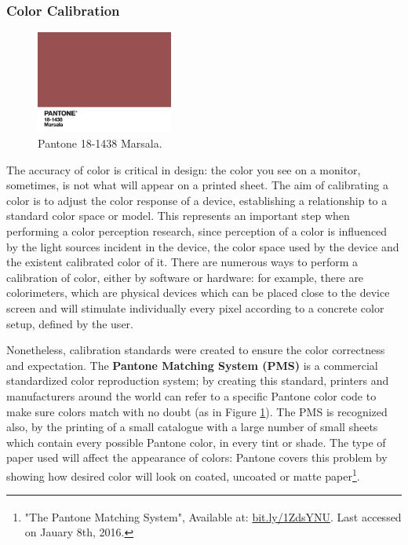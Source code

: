 \subsubsection{Color Calibration}
%
\begin{figure}
	\centering
    \vspace{-\baselineskip}
    \includegraphics[width=0.4\textwidth]{images/background/Pantone_Marsala.jpg}
    \caption[Pantone Matching System - Marsala]{Pantone 18-1438 Marsala.\protect\footnotemark[21]}
    \label{fig:pantone}
\end{figure}
%
The accuracy of color is critical in design: the color you see on a monitor, sometimes, is not what will appear on a printed sheet. The aim of calibrating a color is to adjust the color response of a device, establishing
a relationship to a standard color space or model. This represents an important step when performing a
color perception research, since perception of a color is influenced by the light sources incident in the
device, the color space used by the device and the existent calibrated color of it. There are numerous
ways to perform a calibration of color, either by software or hardware: for example, there are colorimeters, which
are physical devices which can be placed close to the device screen and will stimulate individually every pixel
according to a concrete color setup, defined by the user. \par
Nonetheless, calibration standards were created to ensure the color correctness and expectation. The
\textbf{Pantone Matching System (PMS)} is a commercial standardized color reproduction system; by creating
this standard, printers and manufacturers around the world can refer to a specific Pantone color code to
make sure colors match with no doubt (as in Figure \ref{fig:pantone}). The PMS is recognized also, by the printing of a small catalogue with
a large number of small sheets which contain every possible Pantone color, in every tint or shade. The type
of paper used will affect the appearance of colors: Pantone covers this problem by showing how desired
color will look on coated, uncoated or matte paper\footnote{"The Pantone Matching System\textsuperscript{\textregistered}",
Available at: \url {bit.ly/1ZdsYNU}. Last accessed on Jauary 8th, 2016.}.
